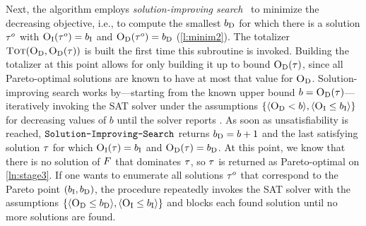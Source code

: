 Next, the algorithm employs \emph{solution-improving search}~\autocites{handbook2-maxsat,DBLP:journals/jsat/BerreP10,DBLP:journals/jsat/EenS06} to minimize the decreasing objective, i.e., to compute the smallest $b_{\text{D}}$ for which there is a solution $\tau^o$ with $\textsc{O}_{\text{I}}(\tau^o) = b_{\text{I}}$ and $\textsc{O}_{\text{D}}(\tau^o) = b_{\text{D}}$ (\cref{l:minim2}).
The totalizer $\textsc{Tot}(\textsc{O}_{\text{D}}, \textsc{O}_{\text{D}}(\tau))$ is built the first time this subroutine is invoked.
Building the totalizer at this point allows for only building it up to bound $\textsc{O}_{\text{D}}(\tau)$, since all Pareto-optimal solutions are known to have at most that value for $\textsc{O}_{\text{D}}$.
Solution-improving search works by---starting from the known upper bound $b=\textsc{O}_{\text{D}}(\tau)$---iteratively invoking the SAT solver under the assumptions $\{\langle \textsc{O}_{\text{D}} < b \rangle, \langle \textsc{O}_{\text{I}} \leq b_{\text{I}} \rangle\}$ for decreasing values of $b$ until the solver reports \unsat{}.
As soon as unsatisfiability is reached, $\texttt{Solution-\allowbreak{}Improving-\allowbreak{}Search}$ returns $b_{\text{D}}=b+1$ and the last satisfying solution $\tau$ for which $\textsc{O}_{\text{I}}(\tau) = b_{\text{I}}$ and $\textsc{O}_{\text{D}}(\tau) = b_{\text{D}}$.
At this point, we know that there is no solution of $F$ that dominates $\tau$, so $\tau$ is returned as Pareto-optimal on \cref{ln:stage3}.
If one wants to enumerate all solutions $\tau^o$ that correspond to the Pareto point $(b_{\text{I}},b_{\text{D}})$, the \E{} procedure repeatedly invokes the SAT solver with the assumptions $\{\langle \textsc{O}_{\text{D}} \leq b_{\text{D}} \rangle, \langle \textsc{O}_{\text{I}} \leq b_{\text{I}} \rangle\}$ and blocks each found solution until no more solutions are found.

